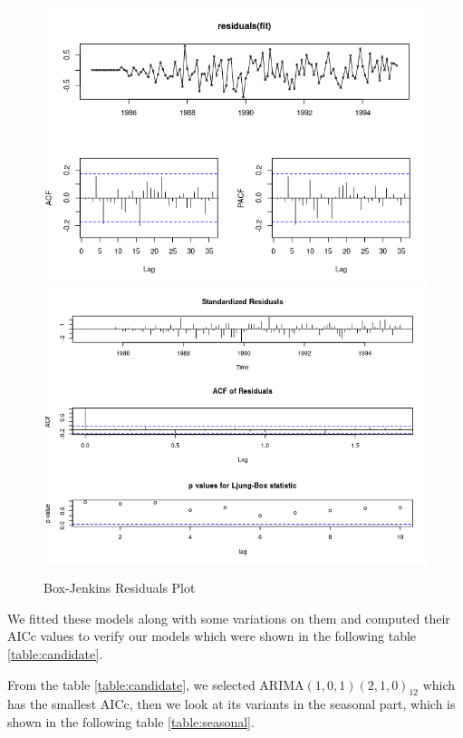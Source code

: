 \documentclass[journal, a4paper]{IEEEtran}
\begin{document}
\begin{figure}[H]
\begin{center}
\includegraphics[scale=0.4]{fig1/bj_residuals.png}
\includegraphics[scale=0.4]{fig1/test_residuals.png}
\caption{Box-Jenkins Residuals Plot}
\label{fig1:bj_residuals}
\end{center}
\end{figure}

We fitted these models along with some variations on them and computed their AICc values to verify our models which were shown in the following table \ref{table:candidate}. 


From the table \ref{table:candidate}, we selected ARIMA$(1,0,1)(2,1,0)_{12}$ which has the smallest AICc, then we look at its variants in the seasonal part, which is shown in the following table \ref{table:seasonal}.
\end{document}
